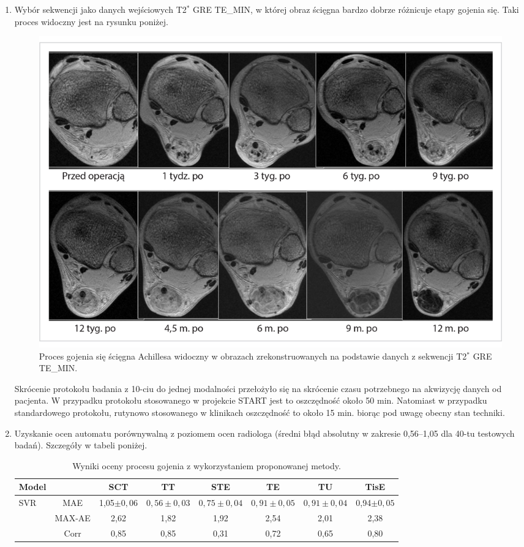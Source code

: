 \begin{enumerate}
	\item Wybór sekwencji jako danych wejściowych T2$^\ast$ GRE TE\_MIN, w której obraz ścięgna bardzo dobrze różnicuje etapy gojenia się. Taki proces widoczny jest na rysunku poniżej.
	\begin{figure}[h!]
		\centering
		\includegraphics[width=1\textwidth]{figures/T2gremin.jpg}
		\caption{Proces gojenia się ścięgna Achillesa widoczny w obrazach zrekonstruowanych na podstawie danych z sekwencji T2$^\ast$ GRE TE\_MIN.}\label{fig:T2comp}
	\end{figure}
	Skrócenie protokołu badania z 10-ciu do jednej modalności przełożyło się na skrócenie czasu potrzebnego na akwizycję danych od pacjenta. W przypadku protokołu stosowanego w projekcie START jest to oszczędność około 50 min. Natomiast w przypadku standardowego protokołu, rutynowo stosowanego w klinikach oszczędność to około 15 min. biorąc pod uwagę obecny stan techniki. 
	\item Uzyskanie ocen automatu porównywalną z poziomem ocen radiologa (średni błąd absolutny w zakresie 0,56--1,05 dla 40-tu testowych badań). Szczegóły w tabeli poniżej. 
	\vspace{0.5cm}
	\begin{table}[h!]
		\caption{Wyniki oceny procesu gojenia z wykorzystaniem proponowanej metody.}
		\scriptsize
		\begin{center}
			\begin{tabular}{lc||c|c|c|c|c|c}
				\textbf{Model} & & \textbf{SCT} & \textbf{TT} & \textbf{STE} & \textbf{TE} & \textbf{TU} & \textbf{TisE}\\ 
				
				\hline \hline
				\multirow{3}{*}{SVR}
				& MAE & 1,05$\pm0,06$ & $0,56\pm0,03$ & $0,75\pm0,04$ & $0,91\pm0,05$ & $0,91\pm0,04$ & 0,94$\pm0,05$\\
				& MAX-AE & 2,62 & 1,82 & 1,92 & 2,54 & 2,01 & 2,38 \\
				& Corr   & 0,85 & 0,85 & 0,31 & 0,72 & 0,65 & 0,80 \\
				\hline
			\end{tabular}
		\end{center}
		\label{tab:trainset}
	\end{table}
	

\end{enumerate}
